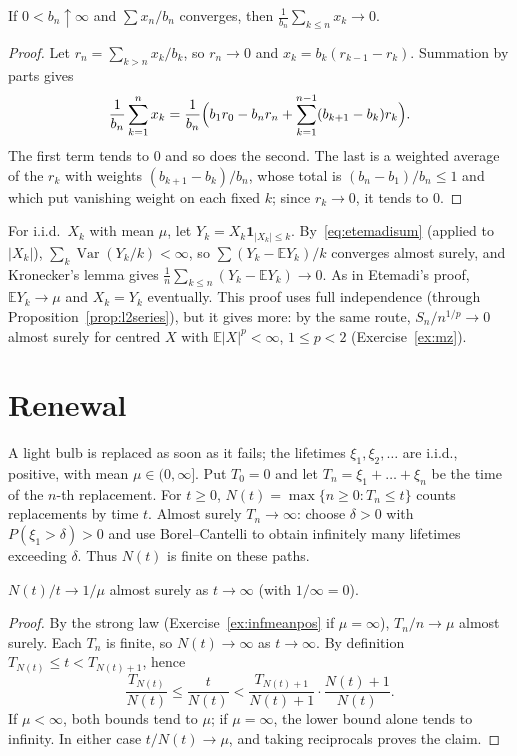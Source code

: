 \begin{lemma}[Kronecker]\label{lem:kronecker}
If $0<b_n\uparrow\infty$ and $\sum x_n/b_n$ converges, then $\frac1{b_n}\sum_{k\le n}x_k\to0$.
\end{lemma}
\begin{proof}
Let $r_n=\sum_{k>n}x_k/b_k$, so $r_n\to0$ and $x_k=b_k(r_{k-1}-r_k)$. Summation by parts gives
\[
\frac1{b_n}\sum_{k=1}^nx_k=\frac1{b_n}\Bigl(b_1r_0-b_nr_n+\sum_{k=1}^{n-1}(b_{k+1}-b_k)r_k\Bigr).
\]
The first term tends to $0$ and so does the second. The last is a weighted average of the $r_k$ with weights $(b_{k+1}-b_k)/b_n$, whose total is
$(b_n-b_1)/b_n\le1$ and which put vanishing weight on each fixed $k$; since $r_k\to0$, it tends to $0$.
\end{proof}

\begin{remark}
For i.i.d.\ $X_k$ with mean $\mu$, let $Y_k=X_k\mathbf 1_{|X_k|\le k}$. By~\eqref{eq:etemadisum} (applied to $|X_k|$), $\sum_k\operatorname{Var}(Y_k/k)<\infty$, so
$\sum(Y_k-\mathbb E Y_k)/k$ converges almost surely, and Kronecker's lemma gives $\frac1n\sum_{k\le n}(Y_k-\mathbb E Y_k)\to0$. As in Etemadi's proof,
$\mathbb E Y_k\to\mu$ and $X_k=Y_k$ eventually. This proof uses full independence (through Proposition~\ref{prop:l2series}), but it gives more: by the
same route, $S_n/n^{1/p}\to0$ almost surely for centred $X$ with $\mathbb E|X|^p<\infty$, $1\le p<2$ (Exercise~\ref{ex:mz}).
\end{remark}

\section{Renewal}

A light bulb is replaced as soon as it fails; the lifetimes $\xi_1,\xi_2,\dots$ are i.i.d., positive, with mean $\mu\in(0,\infty]$. Put $T_0=0$ and let $T_n=\xi_1+\dots+\xi_n$ be the time of the $n$-th replacement. For $t\ge0$, $N(t)=\max\{n\ge0:T_n\le t\}$ counts replacements by time $t$. Almost surely $T_n\to\infty$: choose $\delta>0$ with $P(\xi_1>\delta)>0$ and use Borel--Cantelli to obtain infinitely many lifetimes exceeding $\delta$. Thus $N(t)$ is finite on these paths.

\begin{theorem}\label{thm:renewal}
$N(t)/t\to1/\mu$ almost surely as $t\to\infty$ (with $1/\infty=0$).
\end{theorem}
\begin{proof}
By the strong law (Exercise~\ref{ex:infmeanpos} if $\mu=\infty$), $T_n/n\to\mu$ almost surely. Each $T_n$ is finite, so $N(t)\to\infty$ as
$t\to\infty$. By definition $T_{N(t)}\le t<T_{N(t)+1}$, hence
\[
\frac{T_{N(t)}}{N(t)}\le\frac t{N(t)}<\frac{T_{N(t)+1}}{N(t)+1}\cdot\frac{N(t)+1}{N(t)}.
\]
If $\mu<\infty$, both bounds tend to $\mu$; if $\mu=\infty$, the lower bound alone tends to infinity. In either case $t/N(t)\to\mu$, and taking reciprocals proves the claim.
\end{proof}

